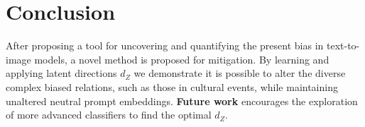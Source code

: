 \section{Conclusion}
After proposing a tool for uncovering and quantifying the present bias in text-to-image models, a novel method is proposed for mitigation. By learning and applying latent directions $d_{Z}$ we demonstrate it is possible to alter the diverse complex biased relations, such as those in cultural events, while maintaining unaltered neutral prompt embeddings. \textbf{Future work} encourages the exploration of more advanced classifiers to find the optimal $d_{Z}$.



